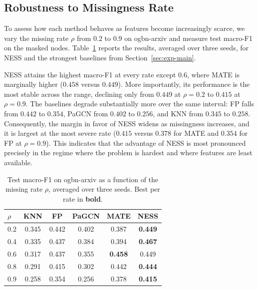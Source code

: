 \subsection{Robustness to Missingness Rate}
\label{sec:exp-rate}

To assess how each method behaves as features become increasingly scarce, we vary the missing rate $\rho$ from $0.2$ to $0.9$ on ogbn-arxiv and measure test macro-F1 on the masked nodes. Table~\ref{tab:rate} reports the results, averaged over three seeds, for NESS and the strongest baselines from Section~\ref{sec:exp-main}.

NESS attains the highest macro-F1 at every rate except $0.6$, where MATE is marginally higher ($0.458$ versus $0.449$). More importantly, its performance is the most stable across the range, declining only from $0.449$ at $\rho=0.2$ to $0.415$ at $\rho=0.9$. The baselines degrade substantially more over the same interval: FP falls from $0.442$ to $0.354$, PaGCN from $0.402$ to $0.256$, and KNN from $0.345$ to $0.258$. Consequently, the margin in favor of NESS widens as missingness increases, and it is largest at the most severe rate ($0.415$ versus $0.378$ for MATE and $0.354$ for FP at $\rho=0.9$). This indicates that the advantage of NESS is most pronounced precisely in the regime where the problem is hardest and where features are least available.

\begin{table}[t]
\centering
\caption{Test macro-F1 on ogbn-arxiv as a function of the missing rate $\rho$, averaged over three seeds. Best per rate in \textbf{bold}.}
\label{tab:rate}
\small
\begin{tabular}{@{}lccccc@{}}
\toprule
$\rho$ & \textbf{KNN} & \textbf{FP} & \textbf{PaGCN} & \textbf{MATE} & \textbf{NESS} \\
\midrule
0.2 & 0.345 & 0.442 & 0.402 & 0.387 & \textbf{0.449} \\
0.4 & 0.335 & 0.437 & 0.384 & 0.394 & \textbf{0.467} \\
0.6 & 0.317 & 0.437 & 0.355 & \textbf{0.458} & 0.449 \\
0.8 & 0.291 & 0.415 & 0.302 & 0.442 & \textbf{0.444} \\
0.9 & 0.258 & 0.354 & 0.256 & 0.378 & \textbf{0.415} \\
\bottomrule
\end{tabular}
\end{table}

